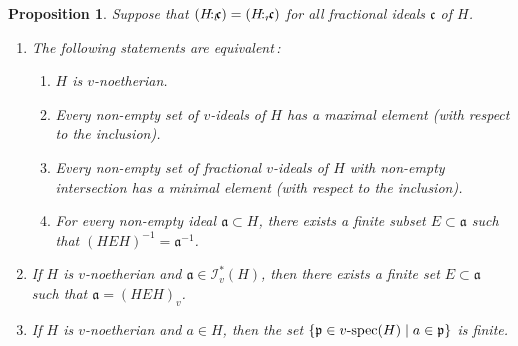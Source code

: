 \documentclass[a4paper]{amsart}
\newtheorem{proposition}[theorem]{Proposition}
\theoremstyle{definition}
\numberwithin{equation}{section}
\begin{document}
\medskip
\begin{proposition} \label{3.13}
Suppose that $(H {\negthinspace :_l \negthinspace} \mathfrak c) = (H {\negthinspace :_r \negthinspace} \mathfrak c)$ for all fractional ideals $\mathfrak c$ of $H$.
\begin{enumerate}
\item The following statements are equivalent{\rm \,:}
\begin{enumerate}
\smallskip
\item[(a)] $H$ is $v$-noetherian.

\smallskip

\item[(b)] Every non-empty set of $v$-ideals of $H$ has a maximal
element {\rm (}with respect to the inclusion{\rm )}.

\smallskip

\item[(c)] Every non-empty set of fractional $v$-ideals of $H$ with
non-empty intersection has a minimal element {\rm (}with respect to
the inclusion{\rm )}.

\smallskip

\item[(d)]
For every non-empty ideal $\mathfrak a \subset H$, there exists a
finite subset $E \subset \mathfrak a$ such that $(HEH)^{-1} =
\mathfrak a^{-1}$.
\end{enumerate}

\smallskip
\item If $H$ is $v$-noetherian and $\mathfrak a \in \mathcal I_v^* (H)$, then there exists a
      finite set $E \subset \mathfrak a$ such that $\mathfrak a =
      (HEH)_v$.

\smallskip
\item If $H$ is $v$-noetherian and  $a \in H$, then the set $\{ \mathfrak p \in v\text{\rm
-spec}(H) \mid a \in \mathfrak p\}$ is finite.
\end{enumerate}
\end{proposition}
\end{document}
